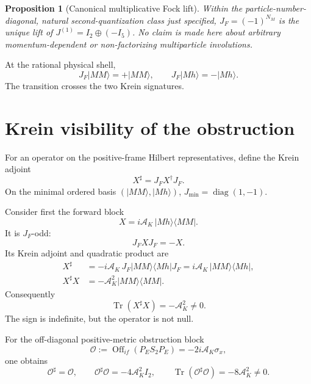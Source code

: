 \documentclass[11pt]{article}
\newtheorem{proposition}[theorem]{Proposition}
\theoremstyle{definition}
\theoremstyle{remark}
\newcommand{\dg}{\dagger}
\newcommand{\Tr}{\operatorname{Tr}}
\newcommand{\AK}{\mathcal A_K}
\begin{document}
\begin{proposition}[Canonical multiplicative Fock lift]
\label{prop:focklift}
Within the particle-number-diagonal, natural second-quantization class
just specified, $J_F=(-1)^{N_M}$ is the unique lift of
$J^{(1)}=I_2\oplus(-I_5)$.  No claim is made here about arbitrary
momentum-dependent or non-factorizing multiparticle involutions.
\end{proposition}

At the rational physical shell,
\begin{equation}\label{eq:statesigns}
J_F|MM\rangle=+|MM\rangle,
\qquad
J_F|Mh\rangle=-|Mh\rangle.
\end{equation}
The transition crosses the two Krein signatures.

\section{Krein visibility of the obstruction}\label{sec:visibility}

For an operator on the positive-frame Hilbert representatives, define
the Krein adjoint
\begin{equation}\label{eq:sharp}
X^\sharp=J_FX^{\dg}J_F.
\end{equation}
On the minimal ordered basis $(|MM\rangle,|Mh\rangle)$,
$J_{\min}=\operatorname{diag}(1,-1)$.

Consider first the forward block
\begin{equation}\label{eq:Xforward}
X=i\AK\,|Mh\rangle\langle MM|.
\end{equation}
It is $J_F$-odd:
\begin{equation}
J_FXJ_F=-X.
\end{equation}
Its Krein adjoint and quadratic product are
\begin{align}\label{eq:Xsharp}
X^\sharp&=-i\AK\,J_F|MM\rangle\langle Mh|J_F
=i\AK\,|MM\rangle\langle Mh|,\nonumber\\
X^\sharp X&=-\AK^2|MM\rangle\langle MM|.
\end{align}
Consequently
\begin{equation}\label{eq:Xtrace}
\boxed{
\Tr(X^\sharp X)=-\AK^2\ne0.}
\end{equation}
The sign is indefinite, but the operator is not null.

For the off-diagonal positive-metric obstruction block
\begin{equation}
\mathcal O:=\operatorname{Off}_{if}(P_ES_2P_E)=-2i\AK\sigma_x,
\end{equation}
one obtains
\begin{equation}\label{eq:Osharp}
\boxed{
\mathcal O^\sharp=\mathcal O,
\qquad
\mathcal O^\sharp\mathcal O=-4\AK^2I_2,
\qquad
\Tr(\mathcal O^\sharp\mathcal O)=-8\AK^2\ne0.}
\end{equation}
\end{document}
